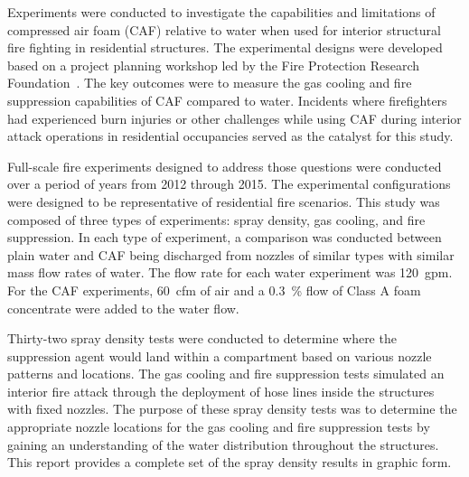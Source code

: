 \documentclass[12pt,oneside]{book}
\begin{document}
Experiments were conducted to investigate the capabilities and limitations of compressed air foam (CAF) relative to water when used for interior structural fire fighting in residential structures. The experimental designs were developed based on a project planning workshop led by the Fire Protection Research Foundation~\cite{Grant:2011}. The key outcomes were to measure the gas cooling and fire suppression capabilities of CAF compared to water. Incidents where firefighters had experienced burn injuries or other challenges while using CAF during interior attack operations in residential occupancies served as the catalyst for this study.

Full-scale fire experiments designed to address those questions were conducted over a period of years from 2012 through 2015. The experimental configurations were designed to be representative of residential fire scenarios. %
This study was composed of three types of experiments: spray density, gas cooling, and fire suppression. In each type of experiment, a comparison was conducted between plain water and CAF being discharged from nozzles of similar types with similar mass flow rates of water. The flow rate for each water experiment was 120~gpm. For the CAF experiments, 60~cfm of air and a 0.3~\% flow of Class A foam concentrate were added to the water flow.

Thirty-two spray density tests were conducted to determine where the suppression agent would land within a compartment based on various nozzle patterns and locations. The gas cooling and fire suppression tests simulated an interior fire attack through the deployment of hose lines inside the structures with fixed nozzles. The purpose of these spray density tests was to determine the appropriate nozzle locations for the gas cooling and fire suppression tests by gaining an understanding of the water distribution throughout the structures. This report provides a complete set of the spray density results in graphic form.
\end{document}
